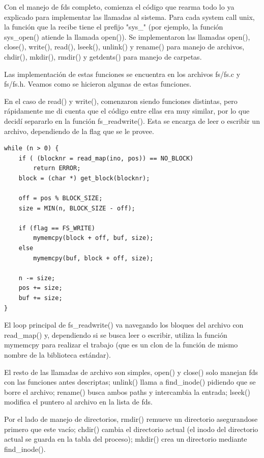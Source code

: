 Con el manejo de fds completo, comienza el código que rearma todo lo ya
explicado para implementar las llamadas al sistema. Para cada system call unix,
la función que la recibe tiene el prefijo "sys\_" (por ejemplo, la función
sys\_open() atiende la llamada open()). Se implementaron las llamadas open(),
close(), write(), read(), lseek(), unlink() y rename() para manejo de archivos,
chdir(), mkdir(), rmdir() y getdents() para manejo de carpetas.

Las implementación de estas funciones se encuentra en los archivos fs/fs.c y
fs/fs.h. Veamos como se hicieron algunas de estas funciones.

En el caso de read() y write(), comenzaron siendo funciones distintas, pero
rápidamente me di cuenta que el código entre ellas era muy similar, por lo que
decidí separarlo en la función fs\_readwrite(). Esta se encarga de leer o
escribir un archivo, dependiendo de la flag que se le provee.

\begin{verbatim}
while (n > 0) {
    if ( (blocknr = read_map(ino, pos)) == NO_BLOCK)
        return ERROR;
    block = (char *) get_block(blocknr);

    off = pos % BLOCK_SIZE;
    size = MIN(n, BLOCK_SIZE - off);

    if (flag == FS_WRITE)
        mymemcpy(block + off, buf, size);
    else
        mymemcpy(buf, block + off, size);

    n -= size;
    pos += size;
    buf += size;
}
\end{verbatim}

El loop principal de fs\_readwrite() va navegando los bloques del archivo con
read\_map() y, dependiendo si se busca leer o escribir, utiliza la función
mymemcpy para realizar el trabajo (que es un clon de la función de mismo nombre
de la biblioteca estándar).

El resto de las llamadas de archivo son simples, open() y close() solo manejan
fds con las funciones antes descriptas; unlink() llama a find\_inode() pidiendo
que se borre el archivo; rename() busca ambos paths y intercambia la entrada;
lseek() modifica el puntero al archivo en la lista de fds.

Por el lado de manejo de directorios, rmdir() remueve un directorio asegurandose
primero que este vacío; chdir() cambia el directorio actual (el inodo del
directorio actual se guarda en la tabla del proceso); mkdir() crea un directorio
mediante find\_inode(). 
